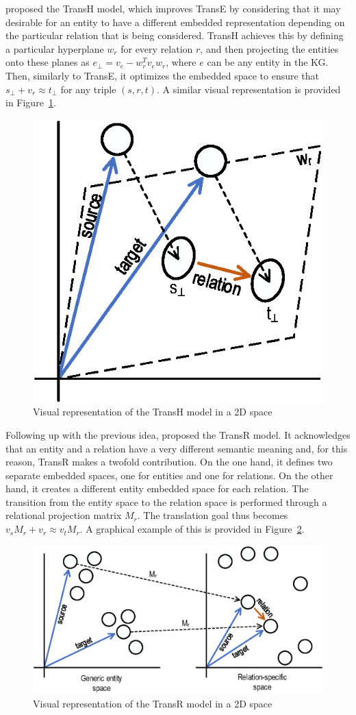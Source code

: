 \citet{wang2014} proposed the TransH model, which improves TransE by considering that it may desirable for an entity to have a different embedded representation depending on the particular relation that is being considered. TransH achieves this by defining a particular hyperplane $w_r$ for every relation $r$, and then projecting the entities onto these planes as $e_\bot = v_e - w_r^{T}v_{e}w_r$, where $e$ can be any entity in the KG. Then, similarly to TransE, it optimizes the embedded space to ensure that $s_\bot + v_r \approx t_\bot$ for any triple $(s, r, t)$. A similar visual representation is provided in Figure~\ref{fig:emb-transH}.

\begin{figure}[!htp]
    \centering
    \includegraphics[width=.4\textwidth]{fig/embedding/transh}
    \caption{Visual representation of the TransH model in a 2D space}
    \label{fig:emb-transH}
\end{figure}

Following up with the previous idea, \citet{lin2015} proposed the TransR model. It acknowledges that an entity and a relation have a very different semantic meaning and, for this reason, TransR makes a twofold contribution. On the one hand, it defines two separate embedded spaces, one for entities and one for relations. On the other hand, it creates a different entity embedded space for each relation. The transition from the entity space to the relation space is performed through a relational projection matrix $M_r$. The translation goal thus becomes $v_sM_r + v_r \approx v_tM_r$. A graphical example of this is provided in Figure~\ref{fig:emb-transR}.

\begin{figure}[!htp]
    \centering
    \includegraphics[width=.85\textwidth]{fig/embedding/transr}
    \caption{Visual representation of the TransR model in a 2D space}
    \label{fig:emb-transR}
\end{figure}

